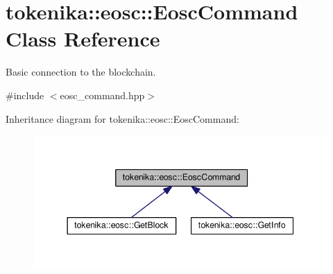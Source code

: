 \hypertarget{classtokenika_1_1eosc_1_1_eosc_command}{}\section{tokenika\+:\+:eosc\+:\+:Eosc\+Command Class Reference}
\label{classtokenika_1_1eosc_1_1_eosc_command}


Basic connection to the blockchain.  




{\ttfamily \#include $<$eosc\+\_\+command.\+hpp$>$}



Inheritance diagram for tokenika\+:\+:eosc\+:\+:Eosc\+Command\+:\nopagebreak
\begin{figure}[H]
\begin{center}
\leavevmode
\includegraphics[width=344pt]{classtokenika_1_1eosc_1_1_eosc_command__inherit__graph}
\end{center}
\end{figure}
